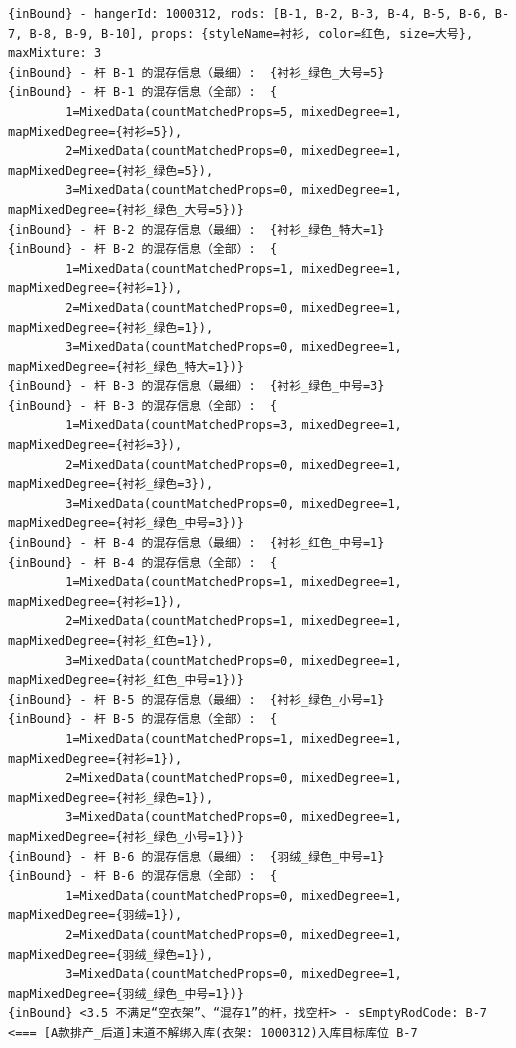 {\begin{verbatim}
{inBound} - hangerId: 1000312, rods: [B-1, B-2, B-3, B-4, B-5, B-6, B-7, B-8, B-9, B-10], props: {styleName=衬衫, color=红色, size=大号}, maxMixture: 3
{inBound} - 杆 B-1 的混存信息（最细）:  {衬衫_绿色_大号=5}
{inBound} - 杆 B-1 的混存信息（全部）:  {
		1=MixedData(countMatchedProps=5, mixedDegree=1, mapMixedDegree={衬衫=5}), 
		2=MixedData(countMatchedProps=0, mixedDegree=1, mapMixedDegree={衬衫_绿色=5}), 
		3=MixedData(countMatchedProps=0, mixedDegree=1, mapMixedDegree={衬衫_绿色_大号=5})}
{inBound} - 杆 B-2 的混存信息（最细）:  {衬衫_绿色_特大=1}
{inBound} - 杆 B-2 的混存信息（全部）:  {
		1=MixedData(countMatchedProps=1, mixedDegree=1, mapMixedDegree={衬衫=1}), 
		2=MixedData(countMatchedProps=0, mixedDegree=1, mapMixedDegree={衬衫_绿色=1}), 
		3=MixedData(countMatchedProps=0, mixedDegree=1, mapMixedDegree={衬衫_绿色_特大=1})}
{inBound} - 杆 B-3 的混存信息（最细）:  {衬衫_绿色_中号=3}
{inBound} - 杆 B-3 的混存信息（全部）:  {
		1=MixedData(countMatchedProps=3, mixedDegree=1, mapMixedDegree={衬衫=3}), 
		2=MixedData(countMatchedProps=0, mixedDegree=1, mapMixedDegree={衬衫_绿色=3}), 
		3=MixedData(countMatchedProps=0, mixedDegree=1, mapMixedDegree={衬衫_绿色_中号=3})}
{inBound} - 杆 B-4 的混存信息（最细）:  {衬衫_红色_中号=1}
{inBound} - 杆 B-4 的混存信息（全部）:  {
		1=MixedData(countMatchedProps=1, mixedDegree=1, mapMixedDegree={衬衫=1}), 
		2=MixedData(countMatchedProps=1, mixedDegree=1, mapMixedDegree={衬衫_红色=1}), 
		3=MixedData(countMatchedProps=0, mixedDegree=1, mapMixedDegree={衬衫_红色_中号=1})}
{inBound} - 杆 B-5 的混存信息（最细）:  {衬衫_绿色_小号=1}
{inBound} - 杆 B-5 的混存信息（全部）:  {
		1=MixedData(countMatchedProps=1, mixedDegree=1, mapMixedDegree={衬衫=1}), 
		2=MixedData(countMatchedProps=0, mixedDegree=1, mapMixedDegree={衬衫_绿色=1}), 
		3=MixedData(countMatchedProps=0, mixedDegree=1, mapMixedDegree={衬衫_绿色_小号=1})}
{inBound} - 杆 B-6 的混存信息（最细）:  {羽绒_绿色_中号=1}
{inBound} - 杆 B-6 的混存信息（全部）:  {
		1=MixedData(countMatchedProps=0, mixedDegree=1, mapMixedDegree={羽绒=1}), 
		2=MixedData(countMatchedProps=0, mixedDegree=1, mapMixedDegree={羽绒_绿色=1}), 
		3=MixedData(countMatchedProps=0, mixedDegree=1, mapMixedDegree={羽绒_绿色_中号=1})}
{inBound} <3.5 不满足“空衣架”、“混存1”的杆，找空杆> - sEmptyRodCode: B-7
<=== [A款排产_后道]末道不解绑入库(衣架: 1000312)入库目标库位 B-7


\end{verbatim}}
